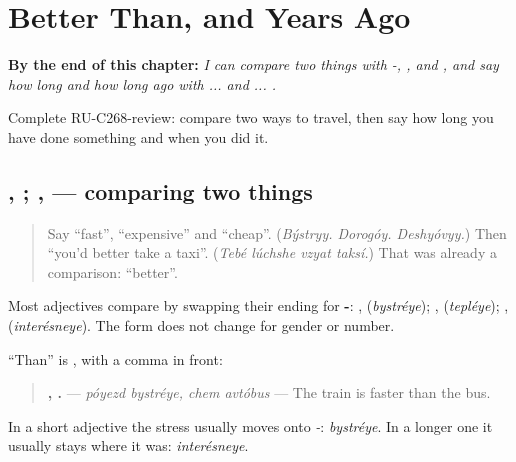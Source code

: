 
\chapter{Better Than, and Years Ago}
\label{ch:ru-better-than-and-years-ago}

\begin{chapteropening}
\textbf{By the end of this chapter:} \emph{I can compare two things with -, ,  and , and say how long and how long ago with  ...  and ... .}

Complete RU-C268-review: compare two ways to travel, then say how long you have done something and when you did it.
\end{chapteropening}

\section[\texorpdfstring{\ru{быстрее}, \ru{чем} … … (bystréye, chem …)}{быстрее, чем … … (bystréye, chem …)}]{, ; ,  — comparing two things}

\label{lesson:RU-C268-bolshe-chem}



\begin{quote}
Say \textquotedblleft{}fast\textquotedblright{}, \textquotedblleft{}expensive\textquotedblright{} and \textquotedblleft{}cheap\textquotedblright{}. (\emph{Býstryy. Dorogóy. Deshyóvyy.}) Then \textquotedblleft{}you'd better take a taxi\textquotedblright{}. (\emph{Tebé lúchshe vzyat taksí.}) That \emph{} was already a comparison: \textquotedblleft{}better\textquotedblright{}.
\end{quote}

\begin{grammarlens}[title={Grammar Lens: -\ru{ее}, and \ru{чем}}]
Most adjectives compare by swapping their ending for \textbf{-}: \emph{}, \textbf{} (\emph{bystréye}); \emph{}, \textbf{} (\emph{tepléye}); \emph{}, \textbf{} (\emph{interésneye}). The form does not change for gender or number.

\textquotedblleft{}Than\textquotedblright{} is \textbf{}, with a comma in front:

\begin{quote}
\textbf{ ,  .} — \emph{póyezd bystréye, chem avtóbus} — The train is faster than the bus.
\end{quote}

In a short adjective the stress usually moves onto \emph{-}: \emph{bystréye}. In a longer one it usually stays where it was: \emph{interésneye}.
\end{grammarlens}

